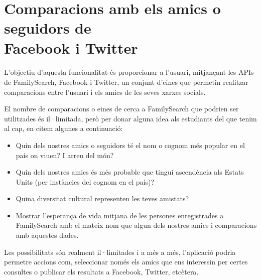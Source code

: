\section{Comparacions amb els amics o seguidors de\\Face\-book i Twitter}

    \paragraph{}
    L'objectiu d'aquesta funcionalitat és proporcionar a l'usuari, mitjançant les APIs de FamilySearch, Facebook i Twitter, un conjunt d'eines que permetin realitzar comparacions entre l'usuari i els amics de les seves xarxes socials.

    El nombre de comparacions o eines de cerca a FamilySearch que podrien ser utilitzades és il·limitada, però per donar alguna idea als estudiants del que tenim al cap, en citem algunes a continuació:

    \begin{itemize}
        \item Quin dels nostres amics o seguidors té el nom o cognom més popular en el país on viuen? I arreu del món?
        \item Quin dels nostres amics és més probable que tingui ascendència als Estats Units (per instàncies del cognom en el país)?
        \item Quina diversitat cultural representen les teves amistats?
        \item Mostrar l'esperança de vida mitjana de les persones enregistrades a FamilySearch amb el mateix nom que algun dels nostres amics i comparacions amb aquestes dades.
    \end{itemize}

    Les possibilitats són realment il·limitades i a més a més, l'aplicació podria permetre accions com, seleccionar només els amics que ens interessin per certes consultes o publicar els resultats a Facebook, Twitter, etcètera.

